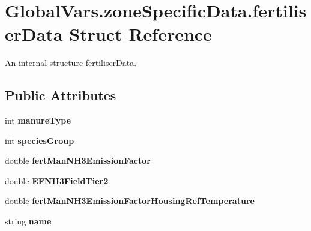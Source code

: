 \hypertarget{struct_global_vars_1_1zone_specific_data_1_1fertiliser_data}{}\section{Global\+Vars.\+zone\+Specific\+Data.\+fertiliser\+Data Struct Reference}
\label{struct_global_vars_1_1zone_specific_data_1_1fertiliser_data}


An internal structure \mbox{\hyperlink{struct_global_vars_1_1zone_specific_data_1_1fertiliser_data}{fertiliser\+Data}}.  


\subsection*{Public Attributes}
\begin{DoxyCompactItemize}
\item 
\mbox{\label{struct_global_vars_1_1zone_specific_data_1_1fertiliser_data_a9b270dd3726622d63659bddf55df0790}} 
int {\bfseries manure\+Type}
\item 
\mbox{\label{struct_global_vars_1_1zone_specific_data_1_1fertiliser_data_a3b04b3df1d8eebb5fd45b9c71410c326}} 
int {\bfseries species\+Group}
\item 
\mbox{\label{struct_global_vars_1_1zone_specific_data_1_1fertiliser_data_a3028ac3da076aa37fc654e48778ffb6d}} 
double {\bfseries fert\+Man\+N\+H3\+Emission\+Factor}
\item 
\mbox{\label{struct_global_vars_1_1zone_specific_data_1_1fertiliser_data_a34272d0e84f2ea210d75513b75631e58}} 
double {\bfseries E\+F\+N\+H3\+Field\+Tier2}
\item 
\mbox{\label{struct_global_vars_1_1zone_specific_data_1_1fertiliser_data_ad70c5242e7d425ade1cf7112775d6453}} 
double {\bfseries fert\+Man\+N\+H3\+Emission\+Factor\+Housing\+Ref\+Temperature}
\item 
\mbox{\label{struct_global_vars_1_1zone_specific_data_1_1fertiliser_data_a71523f1fcc994b969accb37aff6397eb}} 
string {\bfseries name}
\end{DoxyCompactItemize}


